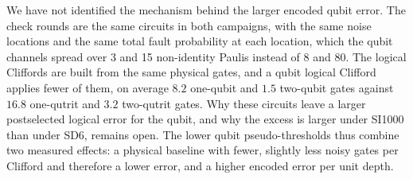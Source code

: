 We have not identified the mechanism behind the larger encoded qubit error. The check rounds are the same circuits in both campaigns, with the same noise locations and the same total fault probability at each location, which the qubit channels spread over 3 and 15 non-identity Paulis instead of 8 and 80. The logical Cliffords are built from the same physical gates, and a qubit logical Clifford applies fewer of them, on average $8.2$ one-qubit and $1.5$ two-qubit gates against $16.8$ one-qutrit and $3.2$ two-qutrit gates. Why these circuits leave a larger postselected logical error for the qubit, and why the excess is larger under SI1000 than under SD6, remains open. The lower qubit pseudo-thresholds thus combine two measured effects: a physical baseline with fewer, slightly less noisy gates per Clifford and therefore a lower error, and a higher encoded error per unit depth.
